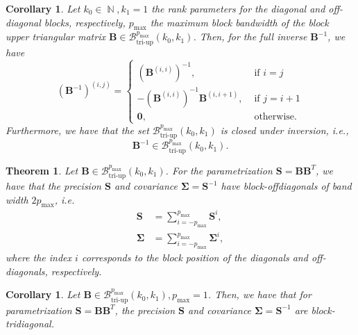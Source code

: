 \documentclass[a4paper, 11pt, oneside]{scrartcl}
\theoremstyle{break}
\newtheorem{theorem}[lemma]{Theorem}
\newtheorem{corollary}[lemma]{Corollary}
\DeclareMathOperator{\Natural}{\mathbb{N}}
\newcommand{\matr}[1]{\boldsymbol{#1}}
\newcommand{\set}[1]{\mathcal{#1}}
\numberwithin{equation}{section}
\begin{document}
				\begin{corollary}
					Let $k_0 \in \Natural, k_1 = 1$ the rank parameters for the diagonal and off-diagonal blocks, respectively, $p_{\text{max}}$ the maximum block bandwidth of the block upper triangular matrix $\matr{B} \in \set{B}_{\text{tri-up}}^{p_{\text{max}}}(k_0, k_1)$.
					Then, for the full inverse $\matr{B}^{-1}$, we have
					\begin{equation}
					(\matr{B}^{-1})^{(i, j)} =
						\begin{cases}
							(\matr{B}^{(i, i)})^{-1}, & \text{ if } i = j \\
							-(\matr{B}^{(i, i)})^{-1} \matr{B}^{(i, i+1)}, & \text{ if } j = i + 1  \\
							\matr{0}, & \text{ otherwise}.
						\end{cases}
					\end{equation}
					Furthermore, we have that the set $\set{B}_{\text{tri-up}}^{p_{\text{max}}}(k_0, k_1)$ is closed under inversion, i.e.,
					\begin{equation}
						\matr{B}^{-1} \in \set{B}_{\text{tri-up}}^{p_{\text{max}}}(k_0, k_1).
					\end{equation}
				\end{corollary}

				\begin{theorem}
					Let $\matr{B} \in \set{B}_{\text{tri-up}}^{p_{\text{max}}}(k_0, k_1)$.
					For the parametrization $\matr{S} = \matr{B} \matr{B}^T$, we have that the precision $\matr{S}$ and covariance $\matr{\Sigma} = \matr{S}^{-1}$ have block-offdiagonals of band width $2 p_{\text{max}}$, i.e.
					\begin{align}
						\matr{S} &= \sum_{i=-p_{\text{max}}}^{p_\text{max}} \matr{S}^i, \\
						\matr{\Sigma} &= \sum_{i=-p_{\text{max}}}^{p_\text{max}} \matr{\Sigma}^i,
					\end{align}
					where the index $i$ corresponds to the block position of the diagonals and off-diagonals, respectively.
				\end{theorem}

				\begin{corollary}
					Let $\matr{B} \in \set{B}_{\text{tri-up}}^{p_{\text{max}}}(k_0, k_1), p_{\text{max}} = 1$.
					Then, we have that for parametrization $\matr{S} = \matr{B} \matr{B}^T$, the precision $\matr{S}$ and covariance $\matr{\Sigma} = \matr{S}^{-1}$ are block-tridiagonal.
				\end{corollary}
\end{document}
